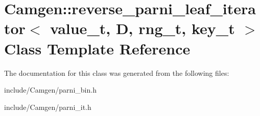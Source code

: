 \hypertarget{a00479}{}\section{Camgen\+:\+:reverse\+\_\+parni\+\_\+leaf\+\_\+iterator$<$ value\+\_\+t, D, rng\+\_\+t, key\+\_\+t $>$ Class Template Reference}
\label{a00479}


The documentation for this class was generated from the following files\+:\begin{DoxyCompactItemize}
\item 
include/\+Camgen/parni\+\_\+bin.\+h\item 
include/\+Camgen/parni\+\_\+it.\+h\end{DoxyCompactItemize}
